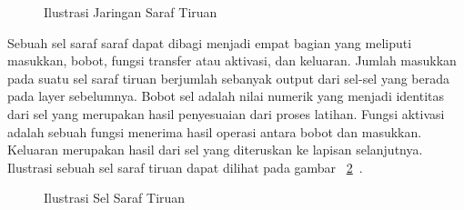 \begin{figure}[htbp]
    \begin{center}
    \end{center}
    \vspace{-20pt}
    \captionsetup{labelfont=bf, textfont=bf}
    \caption{Ilustrasi Jaringan Saraf Tiruan}
    \vspace{-10pt}
    \captionsetup{labelfont=md, textfont=md}
    \label{fig:jaringansaraftiruan}
\end{figure}

Sebuah sel saraf saraf dapat dibagi menjadi empat bagian yang meliputi masukkan, bobot, fungsi
transfer atau aktivasi, dan keluaran. Jumlah masukkan pada suatu sel saraf tiruan berjumlah sebanyak
output dari sel-sel yang berada pada layer sebelumnya. Bobot sel adalah nilai numerik yang menjadi
identitas dari sel yang merupakan hasil penyesuaian dari proses latihan. Fungsi aktivasi adalah
sebuah fungsi menerima hasil operasi antara bobot dan masukkan. Keluaran merupakan hasil dari sel
yang diteruskan ke lapisan selanjutnya. Ilustrasi sebuah sel saraf tiruan dapat dilihat pada gambar
~\ref{fig:saraftiruan}~\cite{Sharma2012ACS}.

\begin{figure}[htbp]
    \begin{center}
    \end{center}
    \vspace{-20pt}
    \captionsetup{labelfont=bf, textfont=bf}
    \caption{Ilustrasi Sel Saraf Tiruan}
    \vspace{-10pt}
    \captionsetup{labelfont=md, textfont=md}
    \label{fig:saraftiruan}
\end{figure}

